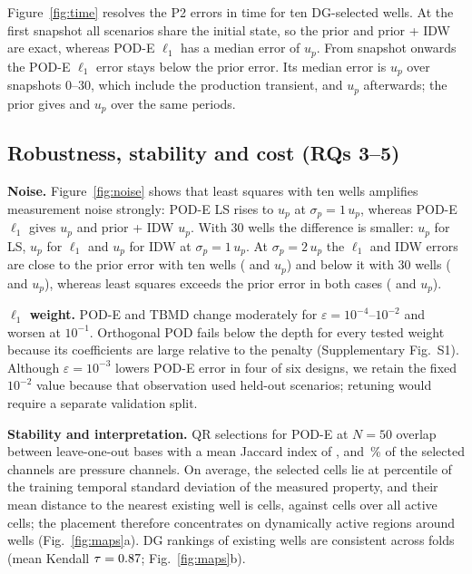 Figure~\ref{fig:time} resolves the P2 errors in time for ten DG-selected wells. At the first snapshot all scenarios share the initial state, so the prior and prior + IDW are exact, whereas POD-E $\ell_1$ has a median error of \TimeLoneFirst{} $u_p$. From snapshot \TimeCrossover{} onwards the POD-E $\ell_1$ error stays below the prior error. Its median error is \TimeLoneEarly{} $u_p$ over snapshots 0--30, which include the production transient, and \TimeLoneLate{} $u_p$ afterwards; the prior gives \TimePriorEarly{} and \TimePriorLate{} $u_p$ over the same periods.



\subsection{Robustness, stability and cost (RQs 3--5)}
\label{sec:res_robust}
\textbf{Noise.} Figure~\ref{fig:noise} shows that least squares with ten wells amplifies measurement noise strongly: POD-E LS rises to \NoiseWellTenPodeLsSigOne{} $u_p$ at $\sigma_p=1\,u_p$, whereas POD-E $\ell_1$ gives \NoiseWellTenPodeLoneSigOne{} $u_p$ and prior + IDW \NoiseWellTenIdwSigOne{} $u_p$. With 30 wells the difference is smaller: \NoiseWellThirtyPodeLsSigOne{} $u_p$ for LS, \NoiseWellThirtyPodeLoneSigOne{} $u_p$ for $\ell_1$ and \NoiseWellThirtyIdwSigOne{} $u_p$ for IDW at $\sigma_p=1\,u_p$. At $\sigma_p=2\,u_p$ the $\ell_1$ and IDW errors are close to the prior error with ten wells (\NoiseWellTenPodeLoneSigTwo{} and \NoiseWellTenIdwSigTwo{} $u_p$) and below it with 30 wells (\NoiseWellThirtyPodeLoneSigTwo{} and \NoiseWellThirtyIdwSigTwo{} $u_p$), whereas least squares exceeds the prior error in both cases (\NoiseWellTenPodeLsSigTwo{} and \NoiseWellThirtyPodeLsSigTwo{} $u_p$).

\textbf{$\ell_1$ weight.} POD-E and TBMD change moderately for $\varepsilon=10^{-4}$--$10^{-2}$ and worsen at $10^{-1}$. Orthogonal POD fails below the depth for every tested weight because its coefficients are large relative to the penalty (Supplementary Fig.~S1). Although $\varepsilon=10^{-3}$ lowers POD-E error in four of six designs, we retain the fixed $10^{-2}$ value because that observation used held-out scenarios; retuning would require a separate validation split.

\textbf{Stability and interpretation.} QR selections for POD-E at $N=50$ overlap between leave-one-out bases with a mean Jaccard index of \StabJacPodeFifty{}, and \StabSharePPodeFifty{}\,\% of the selected channels are pressure channels. On average, the selected cells lie at percentile \StabTstdPodeFifty{} of the training temporal standard deviation of the measured property, and their mean distance to the nearest existing well is \StabDistPodeFifty{} cells, against \StabDistActive{} cells over all active cells; the placement therefore concentrates on dynamically active regions around wells (Fig.~\ref{fig:maps}a). DG rankings of existing wells are consistent across folds (mean Kendall $\tau=0.87$; Fig.~\ref{fig:maps}b).

